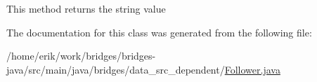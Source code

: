 This method returns the string value 

The documentation for this class was generated from the following file\+:\begin{DoxyCompactItemize}
\item 
/home/erik/work/bridges/bridges-\/java/src/main/java/bridges/data\+\_\+src\+\_\+dependent/\hyperlink{_follower_8java}{Follower.\+java}\end{DoxyCompactItemize}
